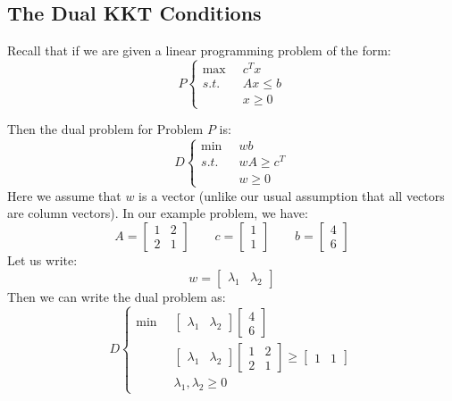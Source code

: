 \subsection{The Dual KKT Conditions}
Recall that if we are given a linear programming problem of the form:
\begin{equation}
P\left\{
\begin{aligned}
\max\;\; & {c}^T{x}\\
s.t.\;\; & {A}{x} \leq {b}\\
& {x} \geq 0
\end{aligned}\right.
\end{equation}

Then the dual problem for Problem $P$ is:
\begin{equation}
D\left\{
\begin{aligned}
\min\;\; & {w}{b}\\
s.t.\;\; & {w}{A} \geq {c}^T\\
& {w} \geq {0}
\end{aligned}\right.
\end{equation}
Here we assume that ${w}$ is a  vector (unlike our usual assumption that all vectors are column vectors). In our example problem, we have:
\begin{equation}
{A} = \begin{bmatrix}1 & 2\\2 & 1\end{bmatrix} \quad \quad {c} = \begin{bmatrix}1\\1\end{bmatrix} \quad \quad {b} = \begin{bmatrix}4\\6\end{bmatrix}
\end{equation}
Let us write:
\begin{equation}
{w} = \begin{bmatrix} \lambda_1 & \lambda_2 \end{bmatrix}
\end{equation}
Then we can write the dual problem as:
\begin{equation}
D\left\{
\begin{aligned}
\min \;\; & \begin{bmatrix} \lambda_1 & \lambda_2 \end{bmatrix} \begin{bmatrix}4\\6\end{bmatrix} \\
& \begin{bmatrix} \lambda_1 & \lambda_2 \end{bmatrix} \begin{bmatrix}1 & 2\\2 & 1\end{bmatrix} \geq \begin{bmatrix}1 & 1\end{bmatrix}\\
& \lambda_1, \lambda_2 \geq 0
\end{aligned}
\right.
\end{equation}

